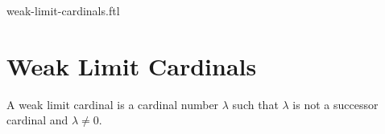\documentclass{naproche-library}
\begin{document}
\begin{smodule}{weak-limit-cardinals.ftl}

  \section*{Weak Limit Cardinals}

  \begin{definition}[forthel,id=SET_THEORY_06_8945210236547450,printid]
    A weak limit cardinal is a cardinal number $\lambda$ such that $\lambda$ is not a successor cardinal and $\lambda \neq 0$.
  \end{definition}
\end{smodule}
\end{document}
